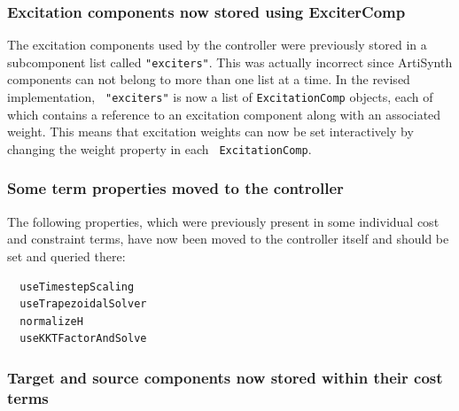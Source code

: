 \documentclass{article}
\begin{document}
\subsubsection*{Excitation components now stored using ExciterComp}

The excitation components used by the controller were previously
stored in a subcomponent list called {\tt "exciters"}. This was
actually incorrect since ArtiSynth components can not belong to more
than one list at a time.  In the revised implementation, {\tt
"exciters"} is now a list of {\tt ExcitationComp} objects, each of
which contains a reference to an excitation component along with an
associated weight. This means that excitation weights can now be set
interactively by changing the {\sf weight} property in each {\tt
ExcitationComp}.

\subsubsection*{Some term properties moved to the controller}

The following properties, which were previously present in some
individual cost and constraint terms, have now been moved to the
controller itself and should be set and queried there:
%
\begin{verbatim}
  useTimestepScaling
  useTrapezoidalSolver
  normalizeH 
  useKKTFactorAndSolve
\end{verbatim}
%

\subsubsection*{Target and source components now stored 
within their cost terms}
\end{document}
